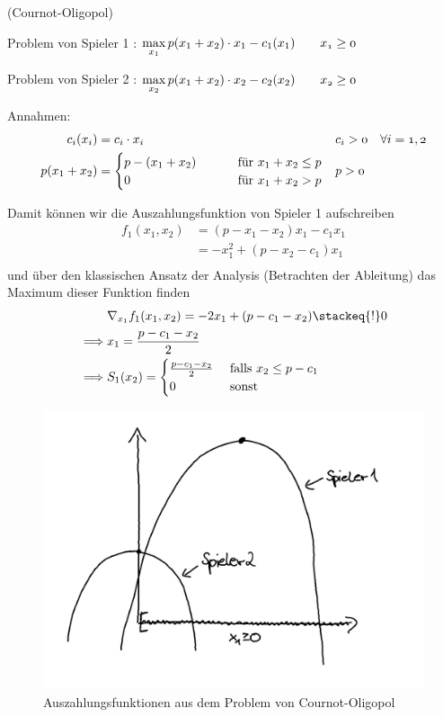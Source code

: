 \begin{beispiel}(Cournot-Oligopol)

Problem von Spieler 1 : $\max\limits_{x_1} p(x_1 + x_2) \cdot x_1 - c_1(x_1) \qquad \mit x_1 \geq 0$ 

Problem von Spieler 2 : $\max\limits_{x_2} p(x_1 + x_2) \cdot x_2 - c_2(x_2) \qquad \mit x_2 \geq 0$ 

Annahmen:
\begin{align*}
	c_{i}(x_{i}) &= c_{i} \cdot x_{i}&  &\mit c_{i} > 0 \quad \forall i=1,2 \\
	p(x_1 + x_2) &= \begin{cases}
		p-(x_1 + x_2) &\qquad \text{ für } x_1 +x_2 \leq p \\
		0 &\qquad \text{ für } x_1 + x_2 > p
	\end{cases}& &\mit p > 0 
\end{align*}

Damit können wir die Auszahlungsfunktion von Spieler 1
aufschreiben
\begin{align*}
	f_1(x_1, x_2) &= (p-x_1 -x_2) x_1 - c_1x_1 \\
				  &= -x_1^2 + (p-x_2-c_1)x_1 \\
\end{align*}
und über den klassischen Ansatz der Analysis (Betrachten der Ableitung) das Maximum dieser Funktion finden
\begin{align*}
	&\nabla_{x_1} f_1(x_1,x_2) = -2x_1 +(p-c_1-x_2) \stackeq{!} 0 \\
	\implies &x_1 = \frac{p-c_1-x_2}{2} \\
	\implies &S_1(x_2) = \begin{cases}
		\frac{p-c_1-x_2}{2} &\text{ falls } x_2 \leq p-c_1 \\
		0 &\text{ sonst}
	\end{cases}
\end{align*}

\begin{figure}[ht!]
\begin{center}
	\includegraphics[scale=0.6]{pics/0.png}
\end{center}
\caption{Auszahlungsfunktionen aus dem Problem von Cournot-Oligopol}
\label{fig:CournotOligopolBsp_1}
\end{figure}


\end{beispiel}
